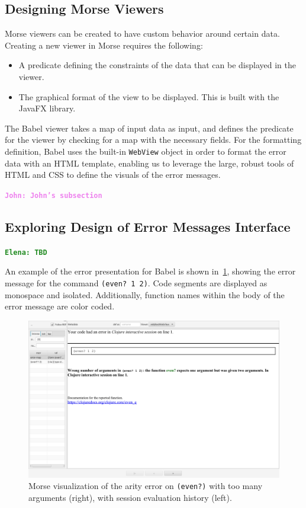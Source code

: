 \documentclass[12pt]{article}
\newcommand{\comment}[1]{{\bf \tt  {#1}}}
\newcommand{\emcomment}[1]{\textcolor{ForestGreen}{\comment{Elena: {#1}}}}
\newcommand{\jwcomment}[1]{\textcolor{violet}{\comment{John: {#1}}}}
\begin{document}
\subsection{Designing Morse Viewers}\label{subsec:Morse-Viewers}
Morse viewers can be created to have custom behavior around certain data.
Creating a new viewer in Morse requires the following:
\begin{itemize}
	\item A predicate defining the constraints of the data that can be displayed in the viewer.
	\item The graphical format of the view to be displayed. This is built with the JavaFX library. 
\end{itemize}
The Babel viewer takes a map of input data as input, and defines the predicate for the viewer by checking for a map with the necessary fields.
For the formatting definition, Babel uses the built-in \texttt{WebView} object in order to format the error data with an HTML template,
enabling us to leverage the large, robust tools of HTML and CSS to define the visuals of the error messages.

\jwcomment{John's subsection}

\subsection{Exploring Design of Error Messages Interface}\label{subsec:interface}
\emcomment{TBD}

An example of the error presentation for Babel is shown in~\ref{fig:babelview}, showing the error message for the command \texttt{(even? 1 2)}. 
Code segments are displayed as monospace and isolated. Additionally, function names within the body of the error message are color coded. 
\begin{figure}
	\centering
	\includegraphics[width=\linewidth]{resources/BabelViewerExample.png}
	\caption{Morse visualization of the arity error on \texttt{(even?)} with too many arguments (right), with session evaluation history (left).}
	\label{fig:babelview}
\end{figure}
\end{document}
